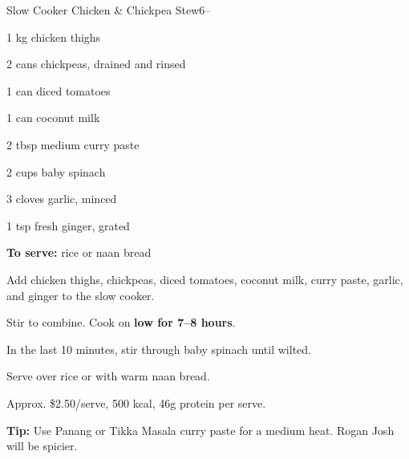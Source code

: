 \begin{recipebox}{Slow Cooker Chicken \& Chickpea Stew}{6}{--}
\begin{ingredients}
  \item 1 kg chicken thighs
  \item 2 cans chickpeas, drained and rinsed
  \item 1 can diced tomatoes
  \item 1 can coconut milk
  \item 2 tbsp medium curry paste
  \item 2 cups baby spinach
  \item 3 cloves garlic, minced
  \item 1 tsp fresh ginger, grated
  \item \textbf{To serve:} rice or naan bread
\end{ingredients}

\begin{method}
  \item Add chicken thighs, chickpeas, diced tomatoes, coconut milk, curry paste, garlic, and ginger to the slow cooker.
  \item Stir to combine. Cook on \textbf{low for 7--8 hours}.
  \item In the last 10 minutes, stir through baby spinach until wilted.
  \item Serve over rice or with warm naan bread.
\end{method}

\begin{notelist}
  \item Approx. \$2.50/serve, 500 kcal, 46g protein per serve.
  \item \textbf{Tip:} Use Panang or Tikka Masala curry paste for a medium heat. Rogan Josh will be spicier.
\end{notelist}
\end{recipebox}
